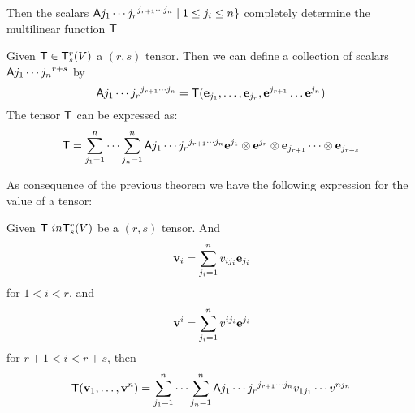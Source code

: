 Then the scalars
\(\mathsf{A}{j_1\cdots j_r} ^{j_{r+1}\cdots j_n}\mid  1\leq j_i\leq n \}\)
completely determine the multilinear function \(\mathsf{T}\!\)



\begin{theorem} \label{tensor-coordinate}
 Given $\mathsf{T} \in \mathsf{T}^r_s(V)$  a $(r,s)$ tensor. Then we can define a collection of scalars
\(\mathsf{A}{j_1\cdots j_n}^{r+s}\) by
\[ \mathsf{A}{j_1\cdots j_r} ^{j_{r+1}\cdots j_n}=\mathsf{T}(\mathbf{ e}_{j_1},\ldots,\mathbf{ e}_{j_r}, \mathbf{ e}^{j_{r+1}}\ldots \mathbf{ e}^{j_n})\]
The tensor $\mathsf{T}$ can be expressed as:
\[\mathsf{T}=\displaystyle\sum_{j_1=1}^{n} \cdots \displaystyle\sum_{j_n=1}^{n}  \mathsf{A}{j_1\cdots j_r} ^{j_{r+1}\cdots j_n} \mathbf{ e}^{j_1}\otimes \mathbf{ e}^{j_r} \otimes \mathbf{ e}_{j_{r+1}} \cdots \otimes \mathbf{ e}_{j_{r+s}}
\]
\end{theorem}


As consequence of the previous theorem we have the following expression for the value of a tensor:


\begin{theorem} \label{tensor-coordinate2}

Given $\mathsf{T}\ in \mathsf{T}^r_s(V)$
be   a $(r,s)$ tensor. And 
\[\mathbf{ v}_i = \displaystyle\sum_{j_i=1}^{n} v_{ij_i} \mathbf{ e}_{j_i}\!\]
for \(1 <i <r\!\), and 
\[\mathbf{ v}^i = \displaystyle\sum_{j_i=1}^{n} v^{ij_i} \mathbf{ e}^{j_i}\!\]
for \(r+1 <i <r+s\!\),  then
\[\mathsf{T}(\mathbf{ v}_1,\ldots,\mathbf{ v}^n) = \displaystyle\sum_{j_1=1}^{n} \cdots \displaystyle\sum_{j_n=1}^{n}  \mathsf{A}{j_1\cdots j_r} ^{j_{r+1}\cdots j_n} v_{1j_1}\cdots v^{nj_n} \]
 
\end{theorem}

